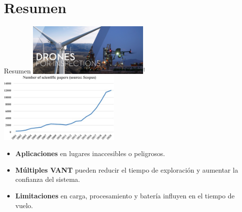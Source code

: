 \documentclass[
  24pt, %
  aspectratio=169, %
]{beamer}
\begin{document}
\section{Resumen}
\begin{frame}{Resumen}
  \bigskip %
  \centering
  \includegraphics[width=0.45\textwidth,height=0.35\textheight]{DJI_B1}$^\dag$
  \hfil
  \includegraphics[width=0.45\textwidth,height=0.35\textheight]{survey_chart.jpg}\footnotemark
  \vspace{2pt}\\
  
  \begin{itemize}
  \item \textbf{Aplicaciones} en lugares inaccesibles o peligrosos.
  \item \textbf{Múltiples VANT} pueden reducir el tiempo de exploración y aumentar la confianza del sistema.
  \item \textbf{Limitaciones} en carga, procesamiento y batería influyen en el tiempo de vuelo.
  \end{itemize}

\end{frame}
\end{document}
